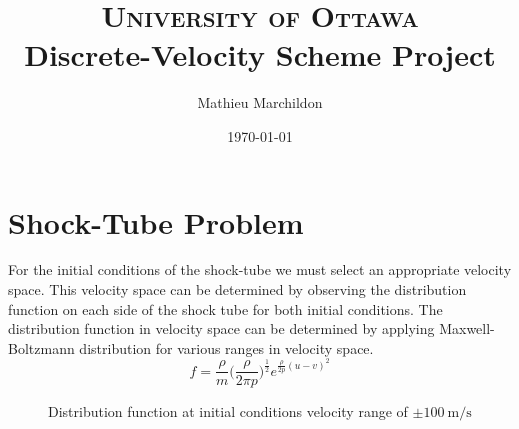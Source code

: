 \documentclass[paper=a4, fontsize=12pt]{scrartcl}
\title{
	\normalfont \normalsize
	\textsc{University of Ottawa} \\ [5pt]
	\huge Discrete-Velocity Scheme Project
}
\author{Mathieu Marchildon} %
\date{\normalsize \today} %
\begin{document}
\maketitle


\section{Shock-Tube Problem}
For the initial conditions of the shock-tube we must select an appropriate velocity space.
This velocity space can be determined by observing the distribution function on each side of
the shock tube for both initial conditions.
The distribution function in velocity space can be determined by applying Maxwell-Boltzmann distribution
for various ranges in velocity space.
\[
        f = \frac{\rho}{m} \Big( \frac{\rho}{2 \pi p}\Big)^{\frac{1}{2}}e^{\frac{\rho}{2 p}(u-v)^2}
\]
\begin{figure}[H]%
    \centering
    \qquad
    \caption{Distribution function at initial conditions \newline velocity range of $\pm \SI{100}{\meter \per \second}$
 }
    \label{fig:init_100}%
\end{figure}
\end{document}
